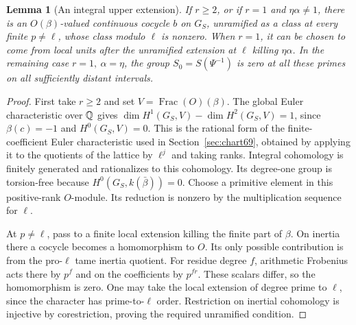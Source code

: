 \documentclass[a4paper,11pt]{article}
\newtheorem{lemma}[proposition]{Lemma}
\theoremstyle{definition}
\theoremstyle{remark}
\numberwithin{equation}{section}
\begin{document}
\begin{lemma}[An integral upper extension]\label{lem:upperclass359}
If \(r\ge2\), or if \(r=1\) and \(\eta\alpha\ne1\), there is an
\(O(\beta)\)-valued continuous cocycle \(b\) on \(G_S\), unramified
as a class at every finite \(p\ne\ell\), whose class modulo \(\ell\)
is nonzero. When \(r=1\), it can be chosen to come from local units
after the unramified extension at \(\ell\) killing \(\eta\alpha\).
In the remaining case \(r=1,\ \alpha=\eta\), the group
\(S_0=S(\Psi^{-1})\) is zero at all these primes on all sufficiently
distant intervals.
\end{lemma}
\begin{proof}
First take \(r\ge2\) and set \(V=\operatorname{Frac}(O)(\beta)\).
The global Euler characteristic over \(\mathbb Q\) gives
\(\dim H^1(G_S,V)-\dim H^2(G_S,V)=1\), since
\(\beta(c)=-1\) and \(H^0(G_S,V)=0\). This is the rational form
of the finite-coefficient Euler characteristic used in
Section~\ref{sec:chart69}, obtained by applying it to the quotients
of the lattice by \(\ell^j\) and taking ranks. Integral cohomology
is finitely generated and rationalizes to this cohomology. Its
degree-one group is torsion-free because
\(H^0(G_S,k(\bar\beta))=0\). Choose a primitive element in this
positive-rank \(O\)-module. Its reduction is nonzero by the
multiplication sequence for \(\ell\).

At \(p\ne\ell\), pass to a finite local extension killing the
finite part of \(\beta\). On inertia there a cocycle becomes
a homomorphism to \(O\). Its only possible contribution is from
the pro-\(\ell\) tame inertia quotient. For residue degree \(f\),
arithmetic Frobenius acts there by \(p^f\) and on the coefficients
by \(p^{fr}\). These scalars differ, so the homomorphism is zero.
One may take the local extension of degree prime to \(\ell\),
since the character has prime-to-\(\ell\) order. Restriction on
inertial cohomology is injective by corestriction, proving the
required unramified condition.


\end{proof}
\end{document}
